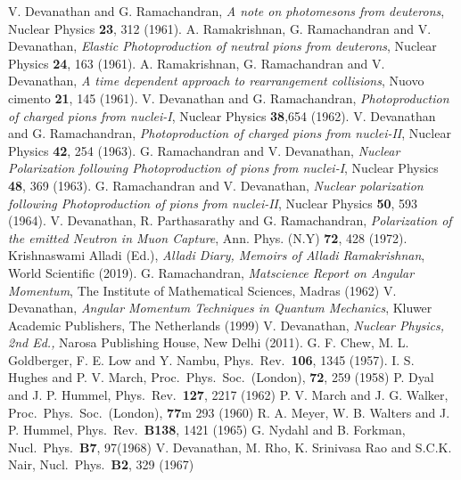 \begin{thebibliography}{99}
 V. Devanathan and G. Ramachandran, \textit{A note on photomesons from deuterons}, Nuclear Physics \textbf{23}, 312 (1961).
 A. Ramakrishnan, G. Ramachandran and V. Devanathan, \textit{Elastic Photoproduction of neutral pions from deuterons}, Nuclear Physics \textbf{24}, 163 (1961).
 A. Ramakrishnan, G. Ramachandran and V. Devanathan, \textit{A time dependent approach to rearrangement collisions}, Nuovo cimento \textbf{21}, 145 (1961).
 V. Devanathan and G. Ramachandran, \textit{Photoproduction of charged pions from nuclei-I}, Nuclear Physics \textbf{38},654 (1962).
 V. Devanathan and G. Ramachandran, \textit{Photoproduction of charged pions from nuclei-II}, Nuclear Physics \textbf{42}, 254 (1963).
 G. Ramachandran and V. Devanathan, \textit{Nuclear Polarization following Photoproduction of pions from nuclei-I}, Nuclear Physics \textbf{48}, 369 (1963).
 G. Ramachandran and V. Devanathan, \textit{Nuclear polarization following Photoproduction of pions from nuclei-II}, Nuclear Physics \textbf{50}, 593 (1964).
 V. Devanathan, R. Parthasarathy and G. Ramachandran, \textit{Polarization of the emitted Neutron in Muon Capture}, Ann. Phys. (N.Y) \textbf{72}, 428 (1972).
 Krishnaswami Alladi (Ed.), \textit{Alladi Diary, Memoirs of Alladi Ramakrishnan}, World Scientific (2019).
 G. Ramachandran, \textit{Matscience Report on Angular Momentum}, The Institute of Mathematical Sciences, Madras (1962)
 V. Devanathan, \textit{Angular Momentum Techniques in Quantum Mechanics}, Kluwer Academic Publishers, The Netherlands (1999)
 V. Devanathan, \textit{Nuclear Physics, 2nd Ed.,} Narosa Publishing House, New Delhi (2011).
 G. F. Chew, M. L. Goldberger, F. E. Low and Y. Nambu, Phys.\ Rev.\ \textbf{106}, 1345 (1957).
 I. S. Hughes and P. V. March, Proc.\ Phys.\ Soc.\ (London), \textbf{72}, 259 (1958)
 P. Dyal and J. P. Hummel, Phys.\ Rev.\ \textbf{127}, 2217 (1962)
 P. V. March and J. G. Walker, Proc.\ Phys.\ Soc.\ (London), \textbf{77}m 293 (1960)
 R. A. Meyer, W. B. Walters and J. P. Hummel, Phys.\ Rev.\ \textbf{B138}, 1421 (1965)
 G. Nydahl and B. Forkman, Nucl.\ Phys.\ \textbf{B7}, 97(1968)
 V. Devanathan, M. Rho, K. Srinivasa Rao and S.C.K. Nair, Nucl.\ Phys.\ \textbf{B2}, 329 (1967)

\end{thebibliography}
